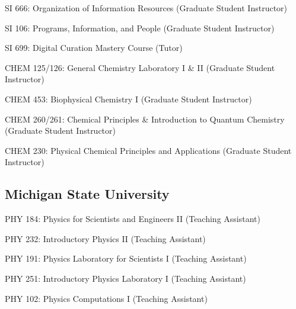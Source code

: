 \documentclass[12pt,letterpaper]{report}
\newcommand{\listitemspace}{0.25em}
\renewenvironment{itemize}
{\begin{list}{}{\setlength{\leftmargin}{0em}
            \setlength{\parskip}{0em}
            \setlength{\itemsep}{\listitemspace}
            \setlength{\parsep}{\listitemspace}}}
{\end{list}}
\begin{document}
\begin{itemize}
    	
    	\item SI 666: Organization of Information Resources (Graduate Student Instructor)
        
	\item SI 106: Programs, Information, and People (Graduate Student Instructor)
        
	\item SI 699: Digital Curation Mastery Course (Tutor)
        
	\item CHEM 125/126: General Chemistry Laboratory I \& II (Graduate Student Instructor)
        
	\item CHEM 453: Biophysical Chemistry I (Graduate Student Instructor)
        
	\item CHEM 260/261: Chemical Principles \& Introduction to Quantum Chemistry (Graduate Student Instructor)
        
	\item CHEM 230: Physical Chemical Principles and Applications (Graduate Student Instructor)
    
\end{itemize}
    	
\subsection*{Michigan State University}

\begin{itemize}

        \item PHY 184: Physics for Scientists and Engineers II (Teaching Assistant)
        
        \item PHY 232: Introductory Physics II (Teaching Assistant)
        
        \item PHY 191: Physics Laboratory for Scientists I (Teaching Assistant)
        
        \item PHY 251: Introductory Physics Laboratory I (Teaching Assistant)
        
        \item PHY 102: Physics Computations I (Teaching Assistant)

\end{itemize}
\end{document}
